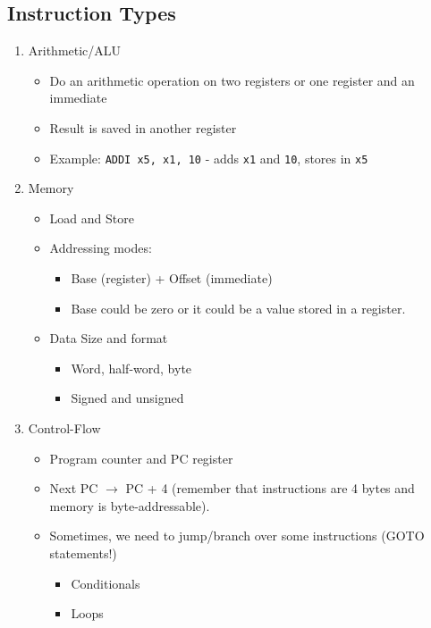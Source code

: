 \documentclass[10pt]{article}
\begin{document}
\subsection*{Instruction Types}
\begin{enumerate}
    \item Arithmetic/ALU
    \begin{itemize}
        \item Do an arithmetic operation on two registers or one register and an immediate
        \item Result is saved in another register
        \item Example: \texttt{ADDI x5, x1, 10} - adds \texttt{x1} and \texttt{10}, stores in \texttt{x5}
    \end{itemize}
    \item Memory
    \begin{itemize}
        \item Load and Store
        \item Addressing modes:
        \begin{itemize}
            \item Base (register) + Offset (immediate)
            \item Base could be zero or it could be a value stored in a register.
        \end{itemize}
        \item Data Size and format
        \begin{itemize}
            \item Word, half-word, byte
            \item Signed and unsigned
        \end{itemize}
    \end{itemize}
    \item Control-Flow
    \begin{itemize}
        \item Program counter and PC register
        \item Next PC $\rightarrow$ PC + 4 (remember that instructions are 4 bytes and memory is byte-addressable).
        \item Sometimes, we need to jump/branch over some instructions (GOTO statements!)
        \begin{itemize}
            \item Conditionals
            \item Loops
        \end{itemize}
    \end{itemize}
\end{enumerate}
\end{document}
